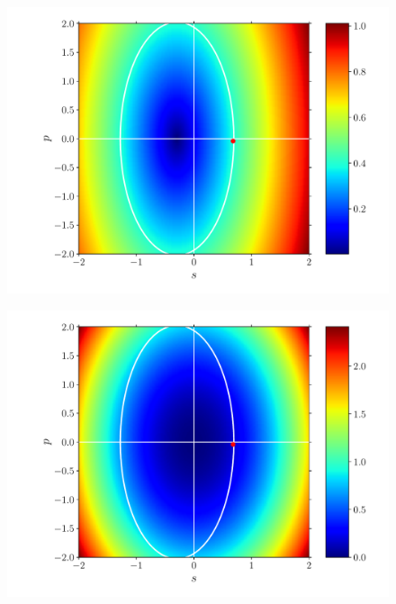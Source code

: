 \documentclass[fleqn]{goose-article}
\begin{document}
\begin{figure}[htp]
    \centering
    \captionsetup[subfigure]{justification=centering}
    \begin{minipage}[t]{.31\textwidth}
        \centering
        \includegraphics[width=\textwidth]{prestress_0_phase-diagram_eps.pdf}
        \subcaption{$\varepsilon$}
        \label{fig:}
    \end{minipage}
    \hfill
    \begin{minipage}[t]{.31\textwidth}
        \centering
        \includegraphics[width=\textwidth]{prestress_0_phase-diagram_energy.pdf}
        \label{fig:}
    \end{minipage}
    \hfill
    \begin{minipage}[t]{.31\textwidth}

\end{minipage}
\end{figure}
\end{document}
